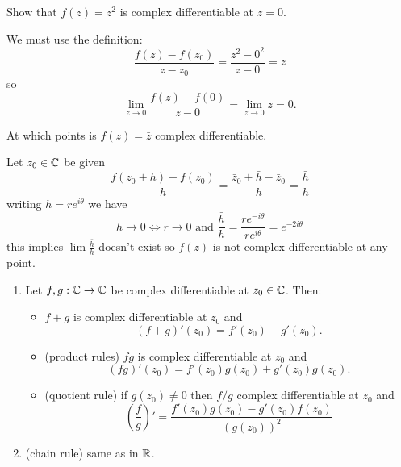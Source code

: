 \documentclass[10pt, a4paper]{article}
\begin{document}
\begin{example}
    Show that $f(z) = z ^ 2$ is complex differentiable at $z = 0$.

    \begin{solution}
        We must use the definition:
        \[
        \frac{f(z) - f(z_0)}{z - z_0} = \frac{z ^ 2 - 0 ^ 2}{z - 0} = z
        \]
        so
        \[
        \lim_{z \to 0}\frac{f(z) - f(0)}{z - 0} = \lim_{z \to 0}z = 0.
        \]
    \end{solution}
\end{example}

\begin{example}
    At which points is $f(z) = \bar{z}$ complex differentiable.

    \begin{solution}
        Let $z_0 \in \mathbb{C}$ be given
        \[
        \frac{f(z_0 + h) - f(z_0)}{h} = \frac{\bar{z}_0 + \bar{h} - \bar{z}_0}{h} = \frac{\bar{h}}{h}
        \]
        writing $h = re ^ {i\theta}$ we have
        \[
        h \to 0 \iff r \to 0\text{ and } \frac{\bar{h}}{h} = \frac{re ^ {-i\theta}}{re ^ {i\theta}} = e ^ {-2i\theta}
        \]
        this implies $\lim\frac{\bar{h}}{h}$ doesn't exist so $f(z)$ is not complex differentiable at any point.
    \end{solution}
\end{example}

\begin{lemma}\phantom{}
    \begin{enumerate}[label = (\roman*)]
        \item Let $f, g : \mathbb{C} \to \mathbb{C}$ be complex differentiable at $z_0 \in \mathbb{C}$.
        Then:
        \begin{itemize}
            \item $f + g$ is complex differentiable at $z_0$ and
            \[
            (f + g)'(z_0) = f'(z_0) + g'(z_0).
            \]

            \item (product rules)
            $fg$ is complex differentiable at $z_0$ and
            \[
            (fg)'(z_0) = f'(z_0)g(z_0) + g'(z_0)g(z_0).
            \]

            \item (quotient rule)
            if $g(z_0) \neq 0$ then $f / g$ complex differentiable at $z_0$ and
            \[
            \left(\frac{f}{g}\right)' = \frac{f'(z_0)g(z_0) - g'(z_0)f(z_0)}{(g(z_0)) ^ 2}
            \]
        \end{itemize}

        \item (chain rule)
        same as in $\mathbb{R}$.
    \end{enumerate}
\end{lemma}
\end{document}
